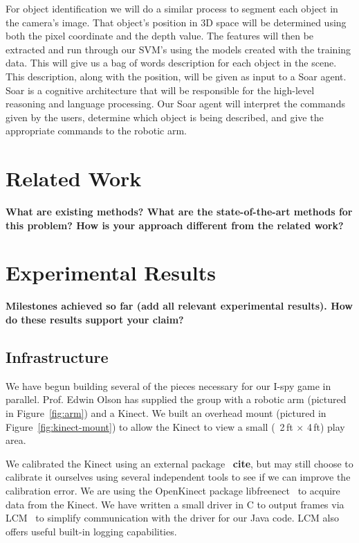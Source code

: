 \documentclass[11pt]{article}
\newcommand{\xxx}[1]{{\bf \color{red} #1}}
\begin{document}
For object identification we will do a similar process to segment each object in the camera's image. That object's position in 3D space will be determined using both the pixel coordinate and the depth value. The features will then be extracted and run through our SVM's using the models created with the training data. This will give us a bag of words description for each object in the scene. This description, along with the position, will be given as input to a Soar agent. Soar is a cognitive architecture that will be responsible for the high-level reasoning and language processing. Our Soar agent will interpret the commands given by the users, determine which object is being described, and give the appropriate commands to the robotic arm.


\section{Related Work}
\xxx{What are existing methods? What are the state-of-the-art methods for this
    problem? How is your approach different from the related work?}

\section{Experimental Results}
\xxx{Milestones achieved so far (add all relevant experimental results). How
    do these results support your claim?}
\subsection{Infrastructure}
We have begun building several of the pieces necessary for our I-spy
game in parallel.  Prof. Edwin Olson has supplied the group with a robotic
arm (pictured in Figure~\ref{fig:arm}) and a Kinect.  We built an
overhead mount (pictured in Figure~\ref{fig:kinect-mount}) to allow the Kinect
to view a small (~2\,ft $\times$ 4\,ft) play area.

We calibrated the Kinect using an external package~\xxx{cite}, but may still
choose to calibrate it ourselves using several independent tools to see if we
can improve the calibration error. We are using the OpenKinect
package libfreenect~\cite{OpenKinect} to acquire data from the Kinect.  We have
written a small driver in C to output frames via LCM~\cite{huang2010} to simplify
communication with the driver for our Java code.  LCM also offers useful
built-in logging capabilities.
\end{document}
